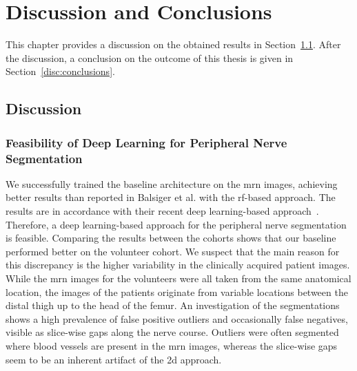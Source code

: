 \chapter{Discussion and Conclusions} \label{chap:discussion_and_conclusions}
This chapter provides a discussion on the obtained results in Section~\ref{disc:discussion}. After the discussion, a conclusion on the outcome of this thesis is given in Section~\ref{disc:conclusions}.

\section{Discussion} \label{disc:discussion}
\subsection{Feasibility of Deep Learning for Peripheral Nerve Segmentation}
We successfully trained the baseline architecture on the \gls{mrn} images, achieving better results than reported in Balsiger et al. \cite{Balsiger2016DevelopmentApproaches} with the \gls{rf}-based approach. The results are in accordance with their recent deep learning-based approach~\cite{Balsiger2018SegmentationApproach}. Therefore, a deep learning-based approach for the peripheral nerve segmentation is feasible.
Comparing the results between the cohorts shows that our baseline performed better on the volunteer cohort. We suspect that the main reason for this discrepancy is the higher variability in the clinically acquired patient images. While the \gls{mrn} images for the volunteers were all taken from the same anatomical location, the images of the patients originate from variable locations between the distal thigh up to the head of the femur. An investigation of the segmentations shows a high prevalence of false positive outliers and occasionally false negatives, visible as slice-wise gaps along the nerve course. Outliers were often segmented where blood vessels are present in the \gls{mrn} images, whereas the slice-wise gaps seem to be an inherent artifact of the \gls{2d} approach.

